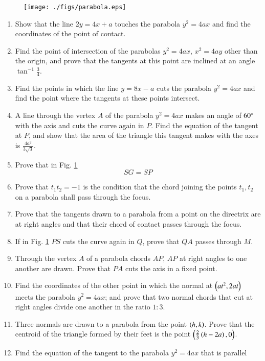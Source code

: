 \begin{figure}[!h]
\centering
\texttt{[image: ./figs/parabola.eps]}
\caption{}
\label{fig:parabola}
\end{figure}
\begin{enumerate}[1.]
\item Show that the line $2y=4x+a$ touches the parabola $y^2=4ax$ and find the coordinates of
the point of contact.
\item Find the point of intersection of the parabolas $y^2=4ax$, $x^2=4ay$ other than the origin, and prove that the tangents
at this point are inclined at an angle $\tan^{-1}\frac{3}{4}$.
\item Find the points in which the line $y=8x-a$ cuts the parabola $y^2=4ax$ and find the point where
the tangents at these points intersect.
\item A line through the vertex $A$ of the parabola $y^2=4ax$ makes an angle of $60\degree$ with
the axis and cuts the curve again in $P$.  Find the equation of the tangent at $P$,
and show that the area of the triangle this tangent makes with the axes is $\frac{4a^2}{3\sqrt{3}}$.
\item Prove that in  Fig. \ref{fig:parabola}
\begin{equation*}
SG=SP
\end{equation*}
\item Prove that $t_1t_2=-1$ is the condition that the chord joining the points $t_1, t_2$ on
a parabola shall pass through the focus.
\item Prove that the tangents drawn to a parabola from a point on the
directrix are at right angles and that their chord of contact passes
through the focus.
\item If in Fig. \ref{fig:parabola} $PS$ cuts the curve again in $Q$, prove that $QA$ passes
through $M$.
\item Through the vertex $A$ of a parabola chords $AP$, $AP$ at right angles
to one another are drawn.  Prove that $PA$ cuts the axis in a fixed point.
\item Find the coordinates of the other point in which the normal at $\left(at^2,2at\right)$
meets the parabola $y^2=4ax$; and prove that two normal chords that cut at right angles
divide one another in the ratio $1:3$.
\item Three normals are drawn to a parabola from the point $\left(h,k\right)$.  Prove that
the centroid of the triangle formed by their feet is the point $\left(\frac{2}{3}\left(h-2a\right),0\right)$.
\item Find the equation of the tangent to the parabola $y^2=4ax$ that is parallel

\end{enumerate}
